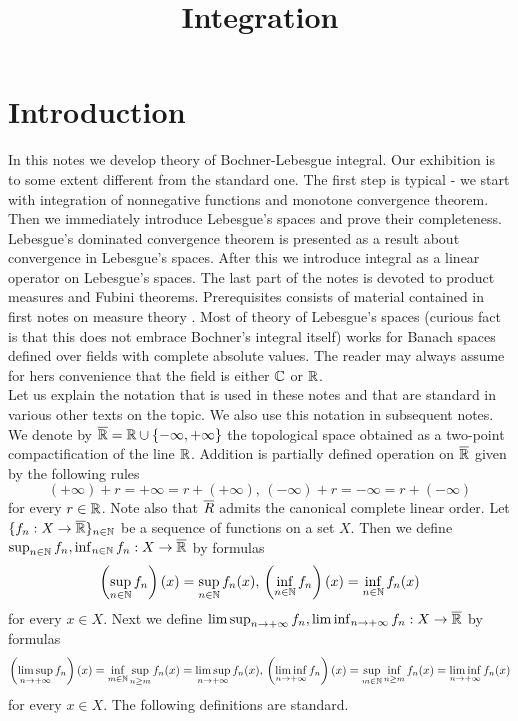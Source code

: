 



\title{Integration}
\date{}
\maketitle

\section{Introduction}
In this notes we develop theory of Bochner-Lebesgue integral. Our exhibition is to some extent different from the standard one. The first step is typical - we start with integration of nonnegative functions and monotone convergence theorem. Then we immediately introduce Lebesgue's spaces and prove their completeness. Lebesgue's dominated convergence theorem is presented as a result about convergence in Lebesgue's spaces. After this we introduce integral as a linear operator on Lebesgue's spaces. The last part of the notes is devoted to product measures and Fubini theorems. Prerequisites consists of material contained in first notes on measure theory \cite{Introductiontomeasuretheory}. Most of theory of Lebesgue's spaces (curious fact is that this does not embrace Bochner's integral itself) works for Banach spaces defined over fields with complete absolute values. The reader may always assume for hers convenience that the field is either ${\mathbb C}$ or ${\mathbb R}$.\\
Let us explain the notation that is used in these notes and that are standard in various other texts on the topic. We also use this notation in subsequent notes. We denote by $\overline{{\mathbb R}}={\mathbb R}\cup \{-\infty,+\infty\}$ the topological space obtained as a two-point compactification of the line ${\mathbb R}$. Addition is partially defined operation on $\overline{{\mathbb R}}$ given by the following rules
$$(+\infty)+r=+\infty=r+(+\infty),\,(-\infty)+r=-\infty=r+(-\infty)$$
for every $r\in {\mathbb R}$. Note also that $\overline{R}$ admits the canonical complete linear order. Let $\{f_n:X\rightarrow \overline{{\mathbb R}}\}_{n\in {\mathbb N}}$ be a sequence of functions on a set $X$. Then we define $\sup_{n\in {\mathbb N}}f_n,\inf_{n\in {\mathbb N}}f_n:X\rightarrow \overline{{\mathbb R}}$ by formulas
$$\left(\sup_{n\in {\mathbb N}}f_n\right)(x) = \sup_{n\in {\mathbb N}}f_n(x),\,\left(\inf_{n\in {\mathbb N}}f_n\right)(x) = \inf_{n\in {\mathbb N}}f_n(x)$$
for every $x\in X$. Next we define $\limsup_{n\rightarrow +\infty}f_n,\liminf_{n\rightarrow +\infty}f_n:X\rightarrow \overline{{\mathbb R}}$ by formulas
$$\left(\limsup_{n\rightarrow +\infty}f_n\right)(x) =\inf_{m\in {\mathbb N}}\sup_{n\geq m}f_n(x) = \limsup_{n\rightarrow +\infty}f_n(x),\,\left(\liminf_{n\rightarrow +\infty}f_n\right)(x) = \sup_{m\in {\mathbb N}}\inf_{n\geq m}f_n(x) = \liminf_{n\rightarrow +\infty}f_n(x)$$
for every $x\in X$. The following definitions are standard.

